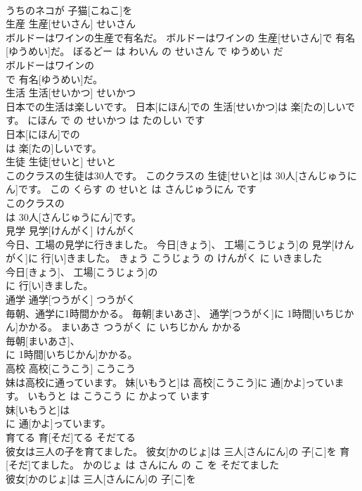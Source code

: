 \documentclass[8pt]{extreport}
\begin{document}
\begin{CJK}{UTF8}{min}
\\	うちのネコが 子猫[こねこ]を
\\	生産	生産[せいさん]	せいさん	
\\	ボルドーはワインの生産で有名だ。	ボルドーはワインの 生産[せいさん]で 有名[ゆうめい]だ。	ぼるどー は わいん の せいさん で ゆうめい だ	
\\	ボルドーはワインの
\\	で 有名[ゆうめい]だ。			
\\	生活	生活[せいかつ]	せいかつ	
\\	日本での生活は楽しいです。	日本[にほん]での 生活[せいかつ]は 楽[たの]しいです。	にほん で の せいかつ は たのしい です	
\\	日本[にほん]での
\\	は 楽[たの]しいです。			
\\	生徒	生徒[せいと]	せいと	
\\	このクラスの生徒は30人です。	このクラスの 生徒[せいと]は 30人[さんじゅうにん]です。	この くらす の せいと は さんじゅうにん です	
\\	このクラスの
\\	は 30人[さんじゅうにん]です。			
\\	見学	見学[けんがく]	けんがく	
\\	今日、工場の見学に行きました。	今日[きょう]、 工場[こうじょう]の 見学[けんがく]に 行[い]きました。	きょう こうじょう の けんがく に いきました	
\\	今日[きょう]、 工場[こうじょう]の
\\	に 行[い]きました。			
\\	通学	通学[つうがく]	つうがく	
\\	毎朝、通学に1時間かかる。	毎朝[まいあさ]、 通学[つうがく]に 1時間[いちじかん]かかる。	まいあさ つうがく に いちじかん かかる	
\\	毎朝[まいあさ]、
\\	に 1時間[いちじかん]かかる。			
\\	高校	高校[こうこう]	こうこう	
\\	妹は高校に通っています。	妹[いもうと]は 高校[こうこう]に 通[かよ]っています。	いもうと は こうこう に かよって います	
\\	妹[いもうと]は
\\	に 通[かよ]っています。			
\\	育てる	育[そだ]てる	そだてる	
\\	彼女は三人の子を育てました。	彼女[かのじょ]は 三人[さんにん]の 子[こ]を 育[そだ]てました。	かのじょ は さんにん の こ を そだてました	
\\	彼女[かのじょ]は 三人[さんにん]の 子[こ]を

\end{CJK}
\end{document}
